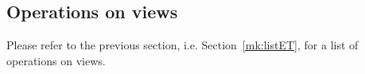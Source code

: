 







%




\subsection{Operations on views}\label{Opns}



Please refer to the previous section, i.e. Section~\ref{mk:listET}, for a list of operations on views. 

